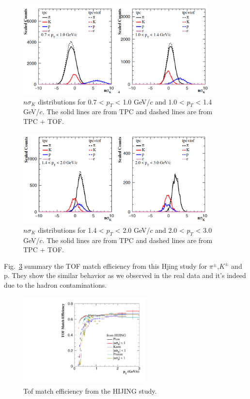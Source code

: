 \begin{figure}[htbp]
\centering
\includegraphics[keepaspectratio,width=0.9\textwidth,angle=-0]{figure/Run14_D0HFT/tofMatch_Hijing_nSigmaK_new_1.png}
\caption{$n\sigma_{K}$ distributions for 0.7 < $p_T$ < 1.0 GeV/$c$ and 1.0 < $p_T$ < 1.4 GeV/$c$. The solid lines are from TPC and dashed lines are from TPC + TOF.}
\label{fig:tpck1}
\end{figure}

\begin{figure}[htbp]
\centering
\includegraphics[keepaspectratio,width=0.9\textwidth,angle=-0]{figure/Run14_D0HFT/tofMatch_Hijing_nSigmaK_new_2.png}
\caption{$n\sigma_{K}$ distributions for 1.4 < $p_T$ < 2.0 GeV/$c$ and 2.0 < $p_T$ < 3.0 GeV/$c$. The solid lines are from TPC and dashed lines are from TPC + TOF.}
\label{fig:tpck2}
\end{figure}

Fig.~\ref{fig:tofMatch_Hijing} summary the TOF match efficiency from this Hjing study for $\pi^{\pm}$,$K^{\pm}$ and p. They show the similar behavior as we observed in the real data and it's indeed due to the hadron contaminations. 

\begin{figure}[htbp]
\centering
\includegraphics[keepaspectratio,width=0.6\textwidth,angle=-0]{figure/Run14_D0HFT/TofMatchEff_Hijing.pdf}
\caption{Tof match efficiency from the HIJING study.}
\label{fig:tofMatch_Hijing}
\end{figure}


